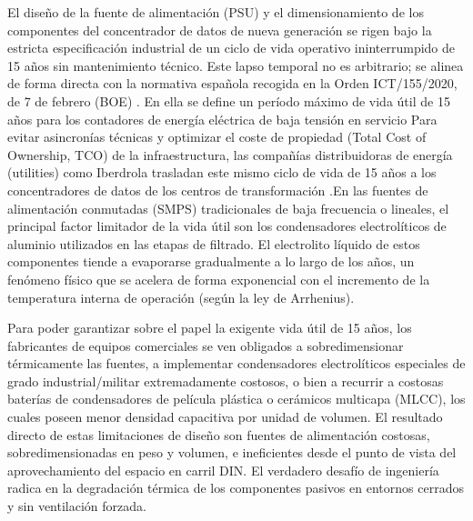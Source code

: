 El diseño de la fuente de alimentación (PSU) y el dimensionamiento de los componentes del concentrador de datos de nueva generación se rigen bajo la estricta especificación industrial de un ciclo de vida operativo ininterrumpido de 15 años sin mantenimiento técnico. Este lapso temporal no es arbitrario; se alinea de forma directa con la normativa española recogida en la Orden ICT/155/2020, de 7 de febrero (BOE) \cite{BOE_ICT155_2020}. En ella se define un período máximo de vida útil de 15 años para los contadores de energía eléctrica de baja tensión en servicio
Para evitar asincronías técnicas y optimizar el coste de propiedad (Total Cost of Ownership, TCO) de la infraestructura, las compañías distribuidoras de energía (utilities) como Iberdrola trasladan este mismo ciclo de vida de 15 años a los concentradores de datos de los centros de transformación \cite{WorldBank_AMI_Survey}.En las fuentes de alimentación conmutadas (SMPS) tradicionales de baja frecuencia o lineales, el principal factor limitador de la vida útil son los condensadores electrolíticos de aluminio utilizados en las etapas de filtrado. El electrolito líquido de estos componentes tiende a evaporarse gradualmente a lo largo de los años, un fenómeno físico que se acelera de forma exponencial con el incremento de la temperatura interna de operación (según la ley de Arrhenius). 

Para poder garantizar sobre el papel la exigente vida útil de 15 años, los fabricantes de equipos comerciales se ven obligados a sobredimensionar térmicamente las fuentes, a implementar condensadores electrolíticos especiales de grado industrial/militar extremadamente costosos, o bien a recurrir a costosas baterías de condensadores de película plástica o cerámicos multicapa (MLCC), los cuales poseen menor densidad capacitiva por unidad de volumen. El resultado directo de estas limitaciones de diseño son fuentes de alimentación costosas, sobredimensionadas en peso y volumen, e ineficientes desde el punto de vista del aprovechamiento del espacio en carril DIN. El verdadero desafío de ingeniería radica en la degradación térmica de los componentes pasivos en entornos cerrados y sin ventilación forzada.

